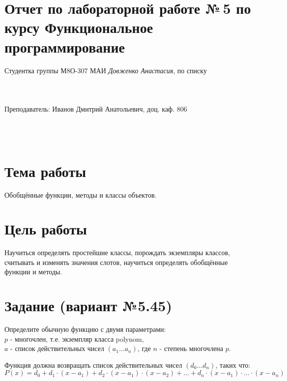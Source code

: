\documentclass[12pt]{article}
\begin{document}
\section*{Отчет по лабораторной работе №\,5
по курсу \guillemotleft  Функциональное программирование\guillemotright}
\begin{flushright}
Студентка группы М8О-307 МАИ \textit{Довженко Анастасия},  по списку \\
 \\
 \\
\ \\
Преподаватель: Иванов Дмитрий Анатольевич, доц. каф. 806 \\
 \\
 \\
 \\

\end{flushright}

\section{Тема работы}
Обобщённые функции, методы и классы объектов.

\section{Цель работы}
Научиться определять простейшие классы, порождать экземпляры классов, считывать и изменять значения слотов, научиться определять обобщённые функции и методы.

\section{Задание (вариант №5.45)}
Определите обычную функцию с двумя параметрами:\\
$p$ - многочлен, т.е. экземпляр класса polynom,\\
$a$ - список действительных чисел $(a_{1} \ldots a_{n})$, где $n$ - степень многочлена $p$.

Функция должна возвращать список действительных чисел
$(d_{0} \ldots d_{n})$, таких что:
$$ P(x) = d_{0} + d_{1} \cdot (x - a_{1}) + d_{2} \cdot (x - a_{1}) \cdot (x - a_{2}) + \ldots + d_{n} \cdot (x - a_{1}) \cdot \ldots \cdot (x - a_{n}) $$
\end{document}
